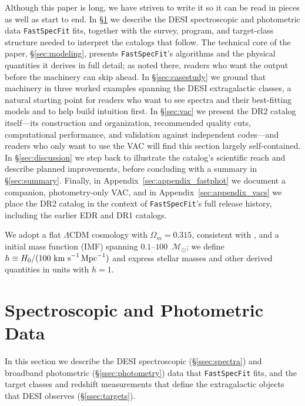 \documentclass[modern,linenumbers]{aastex701}
\newcommand{\fastspecfit}{\texttt{FastSpecFit}}
\newcommand{\kms}{\ensuremath{\mathrm{km~s}^{-1}}}
\newcommand{\msun}{\ensuremath{\mathcal{M}_{\odot}}}
\begin{document}

Although this paper is long, we have striven to write it so it can be
read in pieces as well as start to end. In \S\ref{sec:data} we
describe the DESI spectroscopic and photometric data \fastspecfit{}
fits, together with the survey, program, and target-class structure
needed to interpret the catalogs that follow. The technical core of
the paper, \S\ref{sec:modeling}, presents \fastspecfit{}'s algorithms
and the physical quantities it derives in full detail; as noted there,
readers who want the output before the machinery can skip ahead. In
\S\ref{sec:casestudy} we ground that machinery in three worked
examples spanning the DESI extragalactic classes, a natural starting
point for readers who want to see spectra and their best-fitting
models and to help build intuition first. In \S\ref{sec:vac} we
present the DR2 catalog itself---its construction and organization,
recommended quality cuts, computational performance, and validation
against independent codes---and readers who only want to use the VAC
will find this section largely self-contained. In
\S\ref{sec:discussion} we step back to illustrate the catalog's
scientific reach and describe planned improvements, before concluding
with a summary in \S\ref{sec:summary}. Finally, in
Appendix~\ref{sec:appendix_fastphot} we document a companion,
photometry-only VAC, and in Appendix~\ref{sec:appendix_vacs} we place
the DR2 catalog in the context of \fastspecfit{}'s full release
history, including the earlier EDR and DR1 catalogs.

We adopt a flat $\Lambda$CDM cosmology with $\Omega_m = 0.315$,
consistent with \citet{planck-collaboration20a}, and a
\citet{chabrier03a} initial mass function (IMF) spanning
$0.1$--$100$~\msun; we define $h \equiv H_0 / (100~\kms\,{\rm
  Mpc}^{-1})$ and express stellar masses and other derived quantities
in units with $h=1$.

\section{Spectroscopic and Photometric Data}
\label{sec:data}

In this section we describe the DESI spectroscopic
(\S\ref{ssec:spectra}) and broadband photometric
(\S\ref{ssec:photometry}) data that \fastspecfit{} fits, and the
target classes and redshift measurements that define the extragalactic
objects that DESI observes (\S\ref{ssec:targets}).
\end{document}
